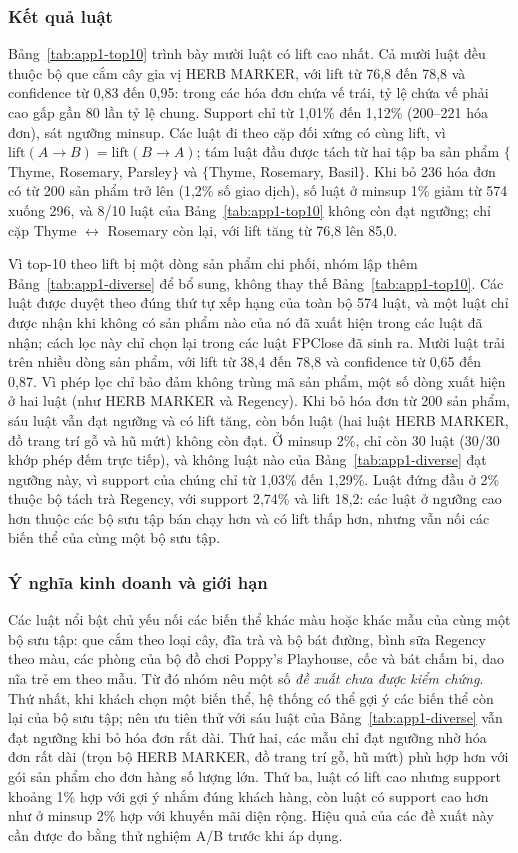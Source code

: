 \subsubsection{Kết quả luật}
Bảng~\ref{tab:app1-top10} trình bày mười luật có lift cao nhất. Cả mười luật đều thuộc bộ que cắm cây gia vị HERB MARKER,
với lift từ 76,8 đến 78,8 và confidence từ 0,83 đến 0,95: trong các hóa đơn chứa vế trái, tỷ lệ chứa vế phải cao gấp gần
80 lần tỷ lệ chung. Support chỉ từ 1,01\% đến 1,12\% (200--221 hóa đơn), sát ngưỡng minsup. Các luật đi theo cặp đối
xứng có cùng lift, vì $\mathrm{lift}(A \rightarrow B) = \mathrm{lift}(B \rightarrow A)$; tám luật đầu được tách từ hai
tập ba sản phẩm $\{$Thyme, Rosemary, Parsley$\}$ và $\{$Thyme, Rosemary, Basil$\}$. Khi bỏ 236 hóa đơn có từ 200 sản
phẩm trở lên (1,2\% số giao dịch), số luật ở minsup 1\% giảm từ 574 xuống 296, và 8/10 luật của
Bảng~\ref{tab:app1-top10} không còn đạt ngưỡng; chỉ cặp Thyme $\leftrightarrow$ Rosemary còn lại, với lift tăng từ 76,8
lên 85,0.

Vì top-10 theo lift bị một dòng sản phẩm chi phối, nhóm lập thêm Bảng~\ref{tab:app1-diverse} để bổ sung, không thay thế
Bảng~\ref{tab:app1-top10}. Các luật được duyệt theo đúng thứ tự xếp hạng của toàn bộ 574 luật, và một luật chỉ được nhận
khi không có sản phẩm nào của nó đã xuất hiện trong các luật đã nhận; cách lọc này chỉ chọn lại trong các luật FPClose đã
sinh ra. Mười luật trải trên nhiều dòng sản phẩm, với lift từ 38,4 đến 78,8 và confidence từ 0,65 đến 0,87. Vì phép lọc
chỉ bảo đảm không trùng mã sản phẩm, một số dòng xuất hiện ở hai luật (như HERB MARKER và Regency). Khi bỏ hóa đơn từ 200 sản
phẩm, sáu luật vẫn đạt ngưỡng và có lift tăng, còn bốn luật (hai luật HERB MARKER, đồ trang trí gỗ và hũ mứt) không còn
đạt. Ở minsup 2\%, chỉ còn 30 luật (30/30 khớp phép đếm trực tiếp), và không luật nào của Bảng~\ref{tab:app1-diverse} đạt
ngưỡng này, vì support của chúng chỉ từ 1,03\% đến 1,29\%. Luật đứng đầu ở 2\% thuộc bộ tách trà Regency, với support
2,74\% và lift 18,2: các luật ở ngưỡng cao hơn thuộc các bộ sưu tập bán chạy hơn và có lift thấp hơn, nhưng vẫn nối các
biến thể của cùng một bộ sưu tập.

\subsubsection{Ý nghĩa kinh doanh và giới hạn}
Các luật nổi bật chủ yếu nối các biến thể khác màu hoặc khác mẫu của cùng một bộ sưu tập: que cắm theo loại cây, đĩa trà
và bộ bát đường, bình sữa Regency theo màu, các phòng của bộ đồ chơi Poppy's Playhouse, cốc và bát chấm bi, dao nĩa trẻ
em theo mẫu. Từ đó nhóm nêu một số \emph{đề xuất chưa được kiểm chứng}. Thứ nhất, khi khách chọn một biến thể, hệ thống
có thể gợi ý các biến thể còn lại của bộ sưu tập; nên ưu tiên thử với sáu luật của Bảng~\ref{tab:app1-diverse} vẫn đạt
ngưỡng khi bỏ hóa đơn rất dài. Thứ hai, các mẫu chỉ đạt ngưỡng nhờ hóa đơn rất dài (trọn bộ HERB MARKER, đồ trang trí gỗ,
hũ mứt) phù hợp hơn với gói sản phẩm cho đơn hàng số lượng lớn. Thứ ba, luật có lift cao nhưng support khoảng 1\% hợp với
gợi ý nhắm đúng khách hàng, còn luật có support cao hơn như ở minsup 2\% hợp với khuyến mãi diện rộng. Hiệu quả của các
đề xuất này cần được đo bằng thử nghiệm A/B trước khi áp dụng.

